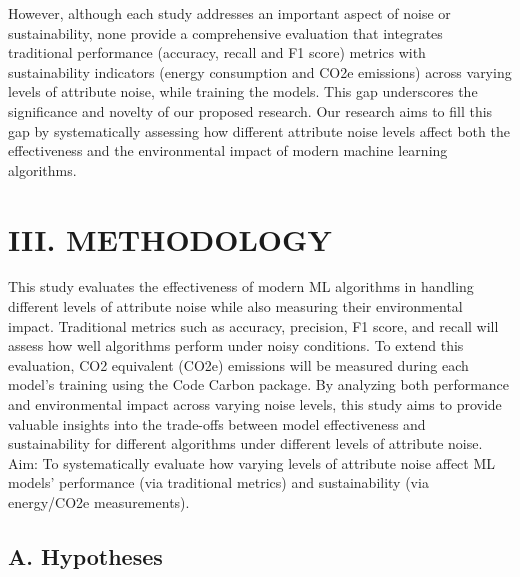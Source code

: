 \documentclass[conference]{IEEEtran}
\begin{document}
\newline
\newline
However, although each study addresses an important aspect of noise or sustainability, none provide a comprehensive evaluation that integrates traditional performance (accuracy, recall and F1 score) metrics with sustainability indicators (energy consumption and CO2e emissions) across varying levels of attribute noise, while training the models. This gap underscores the significance and novelty of our proposed research. Our research aims to fill this gap by systematically assessing how different attribute noise levels affect both the effectiveness and the environmental impact of modern machine learning algorithms.


\section*{III. METHODOLOGY}
This study evaluates the effectiveness of modern ML algorithms in handling different levels of attribute noise while also measuring their environmental impact. Traditional metrics such as accuracy, precision, F1 score, and recall will assess how well algorithms perform under noisy conditions. To extend this evaluation, CO2 equivalent (CO2e) emissions will be measured during each model's training using the Code Carbon package. By analyzing both performance and environmental impact across varying noise levels, this study aims to provide valuable insights into the trade-offs between model effectiveness and sustainability for different algorithms under different levels of attribute noise.
\newline
\newline
Aim: To systematically evaluate how varying levels of attribute noise affect ML models' performance (via traditional metrics) and sustainability (via energy/CO2e measurements).

\subsection*{A. Hypotheses}
\end{document}
